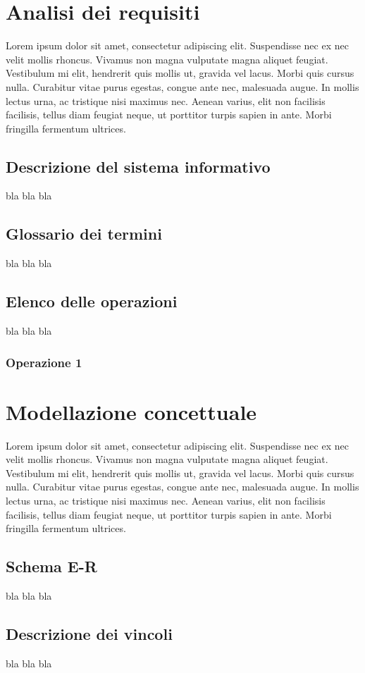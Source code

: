 \documentclass[12pt,a4paper]{article}
\begin{document}
    \section{Analisi dei requisiti}
    Lorem ipsum dolor sit amet, consectetur adipiscing elit. Suspendisse nec ex nec velit mollis rhoncus. Vivamus non magna vulputate magna aliquet feugiat. Vestibulum mi elit, hendrerit quis mollis ut, gravida vel lacus. Morbi quis cursus nulla. Curabitur vitae purus egestas, congue ante nec, malesuada augue. In mollis lectus urna, ac tristique nisi maximus nec. Aenean varius, elit non facilisis facilisis, tellus diam feugiat neque, ut porttitor turpis sapien in ante. Morbi fringilla fermentum ultrices.
    \subsection{Descrizione del sistema informativo}
    bla bla bla
    \subsection{Glossario dei termini}
    bla bla bla
    \subsection{Elenco delle operazioni}
    bla bla bla
    \subsubsection{Operazione 1}

    \section{Modellazione concettuale}
    Lorem ipsum dolor sit amet, consectetur adipiscing elit. Suspendisse nec ex nec velit mollis rhoncus. Vivamus non magna vulputate magna aliquet feugiat. Vestibulum mi elit, hendrerit quis mollis ut, gravida vel lacus. Morbi quis cursus nulla. Curabitur vitae purus egestas, congue ante nec, malesuada augue. In mollis lectus urna, ac tristique nisi maximus nec. Aenean varius, elit non facilisis facilisis, tellus diam feugiat neque, ut porttitor turpis sapien in ante. Morbi fringilla fermentum ultrices.
    \subsection{Schema E-R}
    bla bla bla
    \subsection{Descrizione dei vincoli}
    bla bla bla
\end{document}
